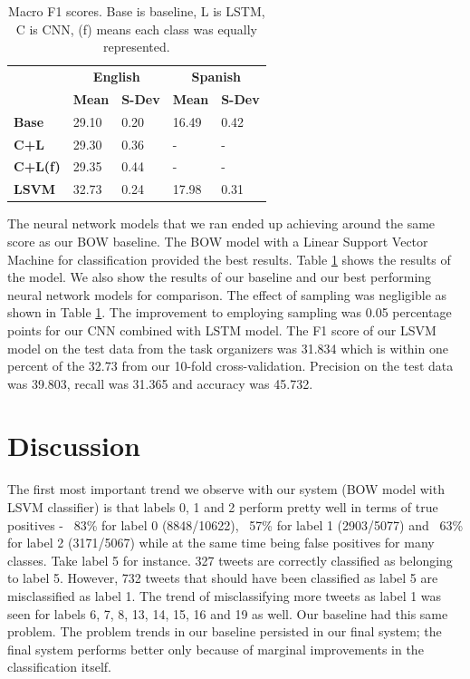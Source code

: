 \documentclass[11pt,a4paper]{article}
\begin{document}
\begin{table}[]
\centering
\begin{tabular}{@{}l|l|l|l|l|@{}}
\cmidrule(l){2-5}
                                    & \multicolumn{2}{c|}{\textbf{English}} & \multicolumn{2}{c|}{\textbf{Spanish}} \\ \cmidrule(l){2-5} 
                                    & \textbf{Mean}     & \textbf{S-Dev}     & \textbf{Mean}     & \textbf{S-Dev}     \\ \midrule
\multicolumn{1}{|l|}{\textbf{Base}}  & 29.10 & 0.20 & 16.49 & 0.42 \\ \midrule
\multicolumn{1}{|l|}{\textbf{C+L}}  & 29.30 & 0.36 & - & - \\ \midrule
\multicolumn{1}{|l|}{\textbf{C+L(f)}}  & 29.35 & 0.44 & - & - \\ \midrule
\multicolumn{1}{|l|}{\textbf{LSVM}}  & 32.73 & 0.24 & 17.98 & 0.31 \\ \bottomrule
\end{tabular}
\caption{Macro F1 scores. Base is baseline, L is LSTM, C is CNN, (f) means each class was equally represented.}
\label{table:results-en}
\end{table}

The neural network models that we ran ended up achieving around the same score as our BOW baseline. 
The BOW model with a Linear Support Vector Machine for classification provided the best results. Table \ref{table:results-en} shows the results of the model. We also show the results of our baseline and our best performing neural network models for comparison. The effect of sampling was negligible as shown in Table \ref{table:results-en}. The improvement to employing sampling was 0.05 percentage points for our CNN combined with LSTM model. The F1 score of our LSVM model on the test data from the task organizers was 31.834 which is within one percent of the 32.73 from our 10-fold cross-validation. Precision on the test data was 39.803, recall was 31.365 and accuracy was 45.732.


\section{Discussion}

The first most important trend we observe with our system (BOW model with LSVM classifier) is that labels 0, 1 and 2 perform pretty well in terms of true positives - ~83\% for label 0 (8848/10622), ~57\% for label 1 (2903/5077) and ~63\% for label 2 (3171/5067) while at the same time being false positives for many classes. Take label 5 for instance. 327 tweets are correctly classified as belonging to label 5. However, 732 tweets that should have been classified as label 5 are misclassified as label 1. The trend of misclassifying more tweets as label 1 was seen for labels 6, 7, 8, 13, 14, 15, 16 and 19 as well. Our baseline had this same problem. The problem trends in our baseline persisted in our final system; the final system performs better only because of marginal improvements in the classification itself.
\end{document}
